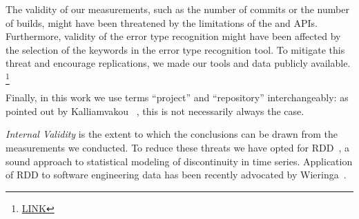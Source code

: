 The validity of our measurements, such as the number of commits or the 
number of builds, might have been threatened by the limitations of the \GH 
and \Tvis APIs.
Furthermore, validity of the error type recognition might have been affected 
by the selection of the keywords in the error type recognition tool. 
To mitigate this threat and encourage replications, we made our tools 
and data publicly available.%
\footnote{\url{LINK}}

Finally, in this work we use terms ``project'' and ``repository'' interchangeably: 
as pointed out by Kalliamvakou \etal~\cite{Kalliamvakou2014Promises}, this is 
not necessarily always the case. 


\smallskip \emph{Internal Validity} is the extent to which the conclusions can 
be drawn from the measurements we conducted. 
To reduce these threats we have opted for RDD~\cite{imbens2008regression}, 
a sound approach to statistical modeling of discontinuity in time series. 
Application of RDD to software engineering data has been recently advocated 
by Wieringa~\cite{Wieringa}.
 
